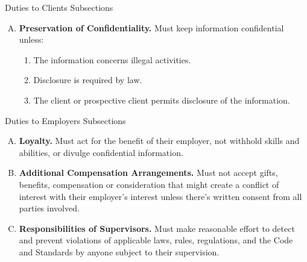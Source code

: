 \documentclass[../custom]{flashcards}
\begin{document}
\begin{flashcard}{Duties to Clients Subsections}
\begin{enumerate}[A.]
        \item \textbf{Preservation of Confidentiality.} Must keep information confidential unless:
            \begin{enumerate}[1.]
                \item The information concerns illegal activities.
                \item Disclosure is required by law.
                \item The client or prospective client permits disclosure of the information.
            \end{enumerate}
    \end{enumerate}
\end{flashcard}

\begin{flashcard}{Duties to Employers Subsections}
    \begin{enumerate}[A.]
        \item \textbf{Loyalty.} Must act for the benefit of their employer, not withhold skills and abilities, or divulge confidential information.
        \item \textbf{Additional Compensation Arrangements.} Must not accept gifts, benefits, compensation or consideration that might create a conflict of interest with their employer's interest unless there's written consent from all parties involved.
        \item \textbf{Responsibilities of Supervisors.} Must make reasonable effort to detect and prevent violations of applicable laws, rules, regulations, and the Code and Standards by anyone subject to their supervision.
    \end{enumerate}
\end{flashcard}
\end{document}
